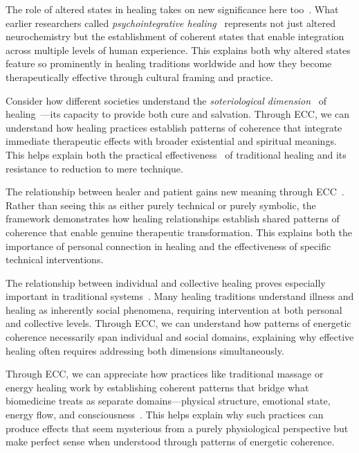The role of altered states in healing takes on new significance here too~\cite{kapferer1991celebration,winkelman2010shamanism}. What earlier researchers called \textit{psychointegrative healing}~ represents not just altered neurochemistry but the establishment of coherent states that enable integration across multiple levels of human experience. This explains both why altered states feature so prominently in healing traditions worldwide and how they become therapeutically effective through cultural framing and practice.

Consider how different societies understand the \textit{soteriological dimension}~ of healing~\cite{good1994medicine}—its capacity to provide both cure and salvation. Through ECC, we can understand how healing practices establish patterns of coherence that integrate immediate therapeutic effects with broader existential and spiritual meanings. This helps explain both the practical effectiveness~ of traditional healing and its resistance to reduction to mere technique.

The relationship between healer and patient gains new meaning through ECC~\cite{laderman1991taming,csordas1994sacred}. Rather than seeing this as either purely technical or purely symbolic, the framework demonstrates how healing relationships establish shared patterns of coherence that enable genuine therapeutic transformation. This explains both the importance of personal connection in healing and the effectiveness of specific technical interventions.

The relationship between individual and collective healing proves especially important in traditional systems~\cite{kleinman1980patients,biehl2005vita}. Many healing traditions understand illness and healing as inherently social phenomena, requiring intervention at both personal and collective levels. Through ECC, we can understand how patterns of energetic coherence necessarily span individual and social domains, explaining why effective healing often requires addressing both dimensions simultaneously.

Through ECC, we can appreciate how practices like traditional massage or energy healing work by establishing coherent patterns that bridge what biomedicine treats as separate domains—physical structure, emotional state, energy flow, and consciousness~\cite{csordas1993somatic,leder1990absent}. This helps explain why such practices can produce effects that seem mysterious from a purely physiological perspective but make perfect sense when understood through patterns of energetic coherence.

